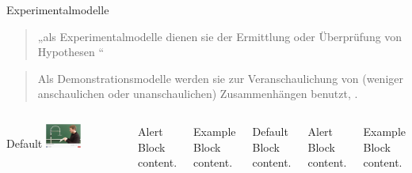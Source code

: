\begin{frame}{Experimentalmodelle}
    \begin{quote}
„\punkti als Experimentalmodelle dienen sie der Ermittlung
oder Überprüfung von Hypothesen \punkti“~\parencite[139]{stachowiak}
    \end{quote}
    \begin{quote}
        Als Demonstrationsmodelle werden sie zur
Veranschaulichung von (weniger anschaulichen oder
unanschaulichen) Zusammenhängen benutzt, \punkti.~\parencite[138]{stachowiak}
    \end{quote}
  \begin{columns}[T,onlytextwidth]
      \begin{block}{Default}
      \href{https://youtu.be/K0aPuLn76H0}{\includegraphics[width=0.3\textwidth]{img/physik-bernoulli.png}}
      \end{block}

      \begin{alertblock}{Alert}
        Block content.
      \end{alertblock}

      \begin{exampleblock}{Example}
        Block content.
      \end{exampleblock}


      \begin{block}{Default}
        Block content.
      \end{block}

      \begin{alertblock}{Alert}
        Block content.
      \end{alertblock}

      \begin{exampleblock}{Example}
        Block content.
      \end{exampleblock}
      


\end{columns}
\end{frame}
